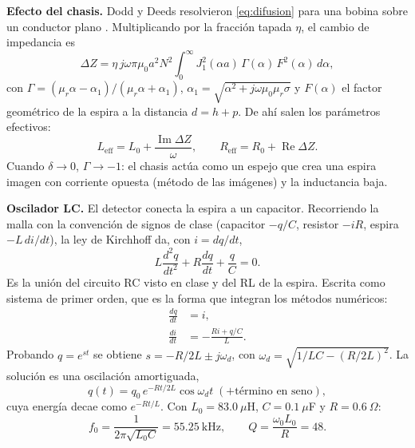 \documentclass[10pt,onecolumn]{article}
\numberwithin{equation}{section}
\numberwithin{figure}{section}
\numberwithin{table}{section}
\begin{document}
\textbf{Efecto del chasis.} Dodd y Deeds resolvieron \eqref{eq:difusion} para una bobina sobre un conductor plano
\cite{dodd1968}. Multiplicando por la fracción tapada $\eta$, el cambio de impedancia es
\begin{equation}
 \Delta Z=\eta\, j\omega\pi\mu_0a^2N^2\!\int_0^\infty\! J_1^2(\alpha a)\,\Gamma(\alpha)\,F^2(\alpha)\,d\alpha,
 \label{eq:dodd}
\end{equation}
con $\Gamma=(\mu_r\alpha-\alpha_1)/(\mu_r\alpha+\alpha_1)$, $\alpha_1=\sqrt{\alpha^2+j\omega\mu_0\mu_r\sigma}$ y
$F(\alpha)$ el factor geométrico de la espira a la distancia $d=h+p$. De ahí salen los parámetros efectivos:
\begin{equation}
 L_{\text{eff}}=L_0+\frac{\operatorname{Im}\Delta Z}{\omega},\qquad R_{\text{eff}}=R_0+\operatorname{Re}\Delta Z .
 \label{eq:efectivos}
\end{equation}
Cuando $\delta\to0$, $\Gamma\to-1$: el chasis actúa como un espejo que crea una espira imagen con corriente opuesta
(método de las imágenes) y la inductancia baja.

\textbf{Oscilador LC.} El detector conecta la espira a un capacitor. Recorriendo la malla con la convención de
signos de clase (capacitor $-q/C$, resistor $-iR$, espira $-L\,di/dt$), la ley de Kirchhoff da, con $i=dq/dt$,
\begin{equation}
 L\frac{d^2q}{dt^2}+R\frac{dq}{dt}+\frac{q}{C}=0 .
 \label{eq:lc}
\end{equation}
Es la unión del circuito RC visto en clase y del RL de la espira. Escrita como sistema de primer orden, que es la
forma que integran los métodos numéricos:
\begin{equation}
\begin{aligned}
    \frac{dq}{dt} &= i,\\
    \frac{di}{dt} &= -\frac{Ri+q/C}{L}.
\end{aligned}
\label{eq:sistema}
\end{equation}
Probando $q=e^{st}$ se obtiene $s=-R/2L\pm j\omega_d$, con
$\omega_d=\sqrt{1/LC-(R/2L)^2}$. La solución es una oscilación amortiguada,
\begin{equation}
 q(t)=q_0\,e^{-Rt/2L}\cos\omega_d t\;(+\text{término en seno}),
 \label{eq:sol_lc}
\end{equation}
cuya energía decae como $e^{-Rt/L}$. Con $L_0=83.0~\mu$H, $C=0.1~\mu$F y $R=0.6~\Omega$:
\begin{equation}
 f_0=\frac{1}{2\pi\sqrt{L_0C}}=55.25~\text{kHz},\qquad Q=\frac{\omega_0L_0}{R}=48 .
 \label{eq:f0}
\end{equation}
\end{document}
